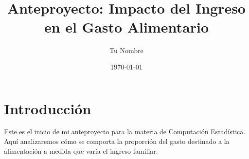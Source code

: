 \documentclass{article}
\title{Anteproyecto: Impacto del Ingreso en el Gasto Alimentario}
\author{Tu Nombre}
\date{\today}
\begin{document}
\maketitle

\section{Introducción}
Este es el inicio de mi anteproyecto para la materia de Computación Estadística. 
Aquí analizaremos cómo se comporta la proporción del gasto destinado a la alimentación a medida que varía el ingreso familiar.
\end{document}

